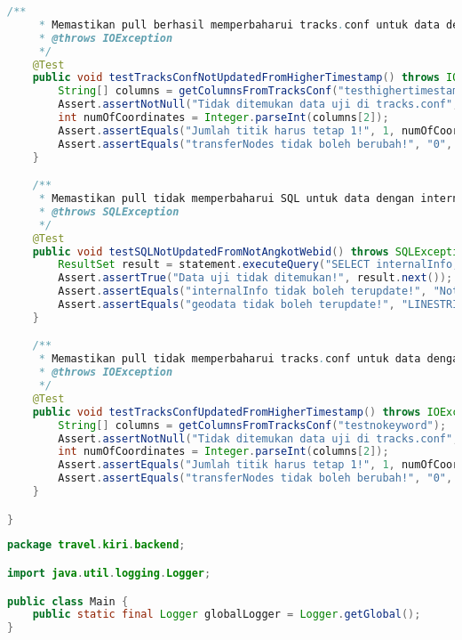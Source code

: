 \begin{lstlisting}[language=Java,basicstyle=\tiny,caption=DataPullerTest.java]
    /**
     * Memastikan pull berhasil memperbaharui tracks.conf untuk data dengan internalInfo berisi 'angkotwebid:nnn:mmm' (dengan timestamp tetapi lebih tinggi)
     * @throws IOException
     */
    @Test
    public void testTracksConfNotUpdatedFromHigherTimestamp() throws IOException {
        String[] columns = getColumnsFromTracksConf("testhighertimestamp");
        Assert.assertNotNull("Tidak ditemukan data uji di tracks.conf", columns);
        int numOfCoordinates = Integer.parseInt(columns[2]);
        Assert.assertEquals("Jumlah titik harus tetap 1!", 1, numOfCoordinates);
        Assert.assertEquals("transferNodes tidak boleh berubah!", "0", columns[5]);
    }   

    /**
     * Memastikan pull tidak memperbaharui SQL untuk data dengan internalInfo berisi 'Not an angkotwebid track' (bukan track yang terintegrasi)
     * @throws SQLException
     */
    @Test
    public void testSQLNotUpdatedFromNotAngkotWebid() throws SQLException {
        ResultSet result = statement.executeQuery("SELECT internalInfo, AsText(geodata) FROM tracks WHERE trackId='testnokeyword';");
        Assert.assertTrue("Data uji tidak ditemukan!", result.next());
        Assert.assertEquals("internalInfo tidak boleh terupdate!", "Not an angkotwebid track", result.getString(1));
        Assert.assertEquals("geodata tidak boleh terupdate!", "LINESTRING(107.6038 -6.91082)", result.getString(2));
    }

    /**
     * Memastikan pull tidak memperbaharui tracks.conf untuk data dengan internalInfo berisi 'Not an angkotwebid track' (bukan track yang terintegrasi)
     * @throws IOException
     */
    @Test
    public void testTracksConfUpdatedFromHigherTimestamp() throws IOException {
        String[] columns = getColumnsFromTracksConf("testnokeyword");
        Assert.assertNotNull("Tidak ditemukan data uji di tracks.conf", columns);
        int numOfCoordinates = Integer.parseInt(columns[2]);
        Assert.assertEquals("Jumlah titik harus tetap 1!", 1, numOfCoordinates);
        Assert.assertEquals("transferNodes tidak boleh berubah!", "0", columns[5]);
    }   

}
\end{lstlisting}

\singlespacing 
%
%
\begin{lstlisting}[language=Java,basicstyle=\tiny,caption=Main.java]
package travel.kiri.backend;

import java.util.logging.Logger;

public class Main {
    public static final Logger globalLogger = Logger.getGlobal();
}
\end{lstlisting}